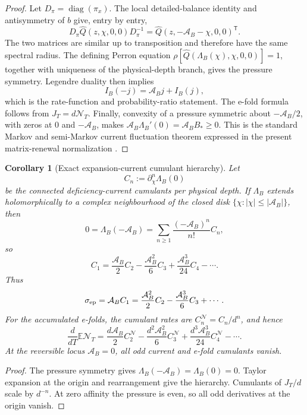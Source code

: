 \documentclass[11pt]{article}
\newtheorem{corollary}[theorem]{Corollary}
\theoremstyle{definition}
\theoremstyle{remark}
\newcommand{\Qhat}{\widehat Q}
\begin{document}
\begin{proof}
Let \(D_\pi=\operatorname{diag}(\pi_x)\).  The local detailed-balance identity
and antisymmetry of \(b\) give, entry by entry,
\[
 D_\pi\Qhat(z,\chi,0,0)D_\pi^{-1}
 =\Qhat(z,-\mathcal A_B-\chi,0,0)^{\mathsf T}.
\]
The two matrices are similar up to transposition and therefore have the same
spectral radius.  The defining Perron equation
\(\rho[\Qhat(\Lambda_B(\chi),\chi,0,0)]=1\), together with uniqueness of the
physical-depth branch, gives the pressure symmetry.  Legendre duality then
implies
\[
 I_B(-j)=\mathcal A_Bj+I_B(j),
\]
which is the rate-function and probability-ratio statement.  The e-fold formula
follows from \(J_T=d\mathcal N_T\).  Finally, convexity of a pressure symmetric
about \(-\mathcal A_B/2\), with zeros at \(0\) and \(-\mathcal A_B\), makes
\(\mathcal A_B\Lambda_B'(0)=\mathcal A_BB_*\ge0\).  This is the standard
Markov and semi-Markov current fluctuation theorem expressed in the present
matrix-renewal normalization
\cite{LebowitzSpohn,AndrieuxGaspard2008,FaggionatoSemiMarkov}.
\end{proof}

\begin{corollary}[Exact expansion-current cumulant hierarchy]
\label{cor:expansion-cumulant-hierarchy}
Let
\[
  C_n:=\partial_\chi^n\Lambda_B(0)
\]
be the connected deficiency-current cumulants per physical depth.  If \(\Lambda_B\) extends holomorphically to a complex neighbourhood of the
closed disk \(\{\chi:|\chi|\le|\mathcal A_B|\}\), then
\[
  0=\Lambda_B(-\mathcal A_B)
   =\sum_{n\ge1}\frac{(-\mathcal A_B)^n}{n!}C_n,
\]
so
\[
  \boxed{
  C_1=\frac{\mathcal A_B}{2}C_2
      -\frac{\mathcal A_B^2}{6}C_3
      +\frac{\mathcal A_B^3}{24}C_4-\cdots .}
\]
Thus
\[
  \sigma_{\rm ep}=\mathcal A_BC_1
  =\frac{\mathcal A_B^2}{2}C_2
   -\frac{\mathcal A_B^3}{6}C_3+\cdots .
\]
For the accumulated e-folds, the cumulant rates are
\(C_n^{\mathcal N}=C_n/d^n\), and hence
\[
 \frac{d}{dT}\mathbb E\mathcal N_T
 =\frac{d\mathcal A_B}{2}C_2^{\mathcal N}
  -\frac{d^2\mathcal A_B^2}{6}C_3^{\mathcal N}
  +\frac{d^3\mathcal A_B^3}{24}C_4^{\mathcal N}-\cdots .
\]
At the reversible locus \(\mathcal A_B=0\), all odd current and e-fold
cumulants vanish.
\end{corollary}

\begin{proof}
The pressure symmetry gives \(\Lambda_B(-\mathcal A_B)=\Lambda_B(0)=0\).
Taylor expansion at the origin and rearrangement give the hierarchy.  Cumulants
of \(J_T/d\) scale by \(d^{-n}\).  At zero affinity the pressure is even, so all
odd derivatives at the origin vanish.
\end{proof}
\end{document}
